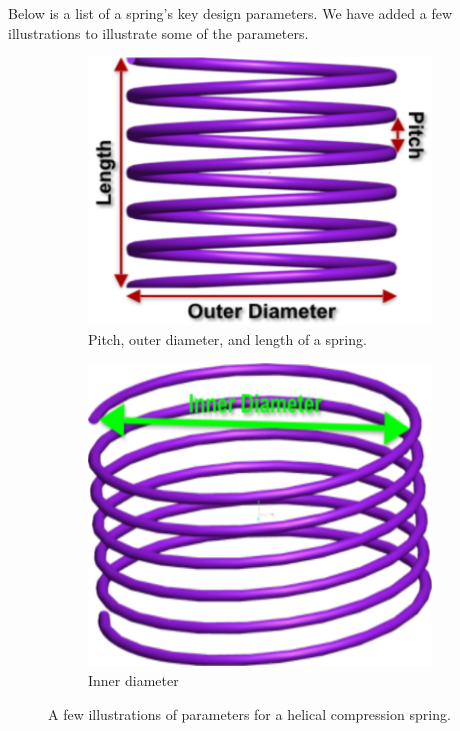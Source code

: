 \documentclass[10pt]{article}
\begin{document}
Below is a list of a spring's key design parameters. We have added a few illustrations to illustrate some of the parameters. 		 
		\begin{figure}[h]
			\centering
			\begin{subfigure}{.5\textwidth}
				\includegraphics[scale=.2]{Spring_Description.png}
				\caption{Pitch, outer diameter, and length of a spring.}
				\label{Description1}
			\end{subfigure}%
			\begin{subfigure}{.5\textwidth}
				  \centering
		 		\includegraphics[scale=.2]{Spring_Description2.png}
				\caption{Inner diameter}
				  \label{Description2}
		  		
			\end{subfigure}
			 \label{Descriptions}
		  \caption{A few illustrations of parameters for a helical compression spring.}
		\end{figure}
		
\end{document}
